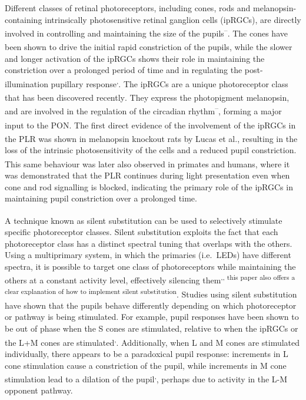 \documentclass[
]{article}
\begin{document}
Different classes of retinal photoreceptors, including cones, rods and melanopsin-containing intrinsically photosensitive retinal ganglion cells (ipRGCs), are directly involved in controlling and maintaining the size of the pupils\textsuperscript{--}. The cones have been shown to drive the initial rapid constriction of the pupils\textsuperscript{}, while the slower and longer activation of the ipRGCs shows their role in maintaining the constriction over a prolonged period of time and in regulating the post-illumination pupillary response\textsuperscript{,}. The ipRGCs are a unique photoreceptor class that has been discovered recently\textsuperscript{}. They express the photopigment melanopsin, and are involved in the regulation of the circadian rhythm\textsuperscript{--}, forming a major input to the PON\textsuperscript{}. The first direct evidence of the involvement of the ipRGCs in the PLR was shown in melanopsin knockout rats by Lucas et al.\textsuperscript{}, resulting in the loss of the intrinsic photosensitivity of the cells and a reduced pupil constriction. This same behaviour was later also observed in primates and humans\textsuperscript{}, where it was demonstrated that the PLR continues during light presentation even when cone and rod signalling is blocked, indicating the primary role of the ipRGCs in maintaining pupil constriction over a prolonged time.

A technique known as silent substitution\textsuperscript{} can be used to selectively stimulate specific photoreceptor classes. Silent substitution exploits the fact that each photoreceptor class has a distinct spectral tuning that overlaps with the others. Using a multiprimary system, in which the primaries (i.e.~LEDs) have different spectra, it is possible to target one class of photoreceptors while maintaining the others at a constant activity level, effectively silencing them\textsuperscript{,, this paper also offers a clear explanation of how to implement silent substitution}. Studies using silent substitution have shown that the pupils behave differently depending on which photoreceptor or pathway is being stimulated. For example, pupil responses have been shown to be out of phase when the S cones are stimulated, relative to when the ipRGCs or the L+M cones are stimulated\textsuperscript{,}. Additionally, when L and M cones are stimulated individually, there appears to be a paradoxical pupil response: increments in L cone stimulation cause a constriction of the pupil, while increments in M cone stimulation lead to a dilation of the pupil\textsuperscript{,}, perhaps due to activity in the L-M opponent pathway.
\end{document}
